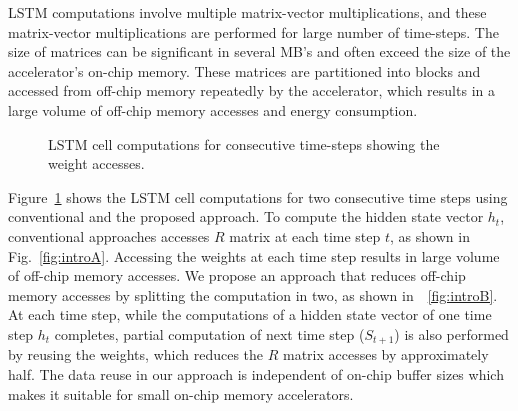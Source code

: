 \documentclass[a4paper,10pt]{article}
\begin{document}
LSTM computations involve multiple matrix-vector multiplications, and these matrix-vector multiplications are performed for large number of time-steps. The size of matrices can be significant in several MB's and often exceed the size of the accelerator's on-chip memory. These matrices are partitioned into blocks and accessed from off-chip memory repeatedly by the accelerator, which results in a large volume of off-chip memory accesses and energy consumption.
\begin{figure}[!htb]
	\centering
	\hfil
	\hfil	
	\caption{LSTM cell computations for consecutive time-steps showing the weight accesses.}
	\label{fig:introToApproach}
	\vspace{-1.0em}	
\end{figure}
Figure{~\ref{fig:introToApproach}} shows the LSTM cell computations for two consecutive time steps using  conventional and the proposed approach. To compute the hidden state vector $h_t$, conventional approaches accesses $R$ matrix at each time step $t$, as shown in Fig.{~\ref{fig:introA}}. Accessing the weights at each time step results in large volume of off-chip memory accesses. We propose an approach that reduces off-chip memory accesses by splitting the computation in two, as shown in~\figurename{~\ref{fig:introB}}. At each time step, while the computations of a hidden state vector of one time step $h_t$ completes, partial computation of next time step ($S_{t+1}$) is also performed by reusing the weights, which reduces the $R$ matrix accesses by approximately half. The data reuse in our approach is independent of on-chip buffer sizes which makes it suitable for small on-chip memory accelerators.
\end{document}
